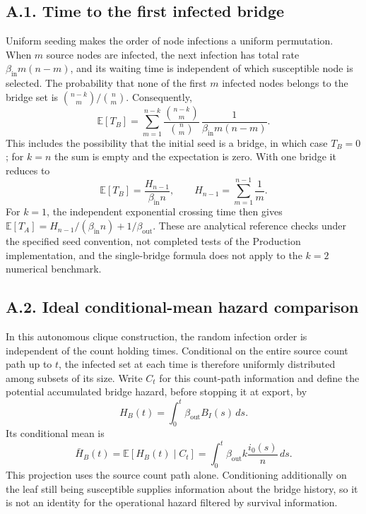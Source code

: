 \documentclass[10pt]{article}
\begin{document}
{\subsection*{A.1. Time to the first infected bridge}
Uniform seeding makes the order of node infections a uniform permutation. When $m$ source nodes are infected, the next infection has total rate $\beta_{\mathrm{in}}m(n-m)$, and its waiting time is independent of which susceptible node is selected. The probability that none of the first $m$ infected nodes belongs to the bridge set is $\binom{n-k}{m}/\binom{n}{m}$. Consequently,
\begin{equation*}
\mathbb{E}[T_B]=\sum_{m=1}^{n-k}\frac{\binom{n-k}{m}}{\binom{n}{m}}\,\frac{1}{\beta_{\mathrm{in}}m(n-m)}.
\end{equation*}
This includes the possibility that the initial seed is a bridge, in which case $T_B=0$; for $k=n$ the sum is empty and the expectation is zero. With one bridge it reduces to
\begin{equation*}
\mathbb{E}[T_B]=\frac{H_{n-1}}{\beta_{\mathrm{in}}n},\qquad H_{n-1}=\sum_{m=1}^{n-1}\frac1m.
\end{equation*}
For $k=1$, the independent exponential crossing time then gives $\mathbb{E}[T_A]=H_{n-1}/(\beta_{\mathrm{in}}n)+1/\beta_{\mathrm{out}}$. These are analytical reference checks under the specified seed convention, not completed tests of the Production implementation, and the single-bridge formula does not apply to the $k=2$ numerical benchmark.

\subsection*{A.2. Ideal conditional-mean hazard comparison}
In this autonomous clique construction, the random infection order is independent of the count holding times. Conditional on the entire source count path up to $t$, the infected set at each time is therefore uniformly distributed among subsets of its size. Write $C_t$ for this count-path information and define the potential accumulated bridge hazard, before stopping it at export, by
\begin{equation*}
H_B(t)=\int_0^t\beta_{\mathrm{out}}B_I(s)\,ds.
\end{equation*}
Its conditional mean is
\begin{equation*}
\bar H_B(t)=\mathbb{E}[H_B(t)\mid C_t]=\int_0^t\beta_{\mathrm{out}}k\frac{i_0(s)}n\,ds.
\end{equation*}
This projection uses the source count path alone. Conditioning additionally on the leaf still being susceptible supplies information about the bridge history, so it is not an identity for the operational hazard filtered by survival information.

}
\end{document}
